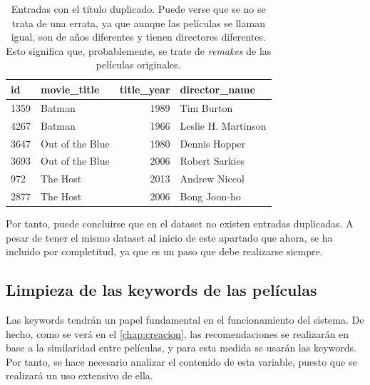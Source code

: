 \begin{table}[h]
\centering
\begin{tabular}{llrl}
\toprule
\textbf{id} &     \textbf{movie\_title} &  \textbf{title\_year} &        \textbf{director\_name} \\
\midrule
1359 &           Batman &      1989 &           Tim Burton \\
4267 &           Batman &      1966 &  Leslie H. Martinson \\
3647 &  Out of the Blue &      1980 &        Dennis Hopper \\
3693 &  Out of the Blue &      2006 &       Robert Sarkies \\
972  &         The Host &      2013 &        Andrew Niccol \\
2877 &         The Host &      2006 &         Bong Joon-ho \\
\bottomrule
\end{tabular}
\caption{Entradas con el título duplicado. Puede verse que se no se trata de una errata, ya que aunque las películas se llaman igual, son de años diferentes y tienen directores diferentes. Esto significa que, probablemente, se trate de \textit{remakes} de las películas originales.}
\label{tab:duplicated_entries}
\end{table}

Por tanto, puede concluirse que en el dataset no existen entradas duplicadas. A pesar de tener el mismo dataset al inicio de este apartado que ahora, se ha incluido por completitud, ya que es un paso que debe realizarse siempre.

\subsection{Limpieza de las keywords de las películas}

Las keywords tendrán un papel fundamental en el funcionamiento del sistema. De hecho, como se verá en el \autoref{chap:creacion}, las recomendaciones se realizarán en base a la similaridad entre películas, y para esta medida se usarán las keywords. Por tanto, se hace necesario analizar el contenido de esta variable, puesto que se realizará un uso extensivo de ella.\\

